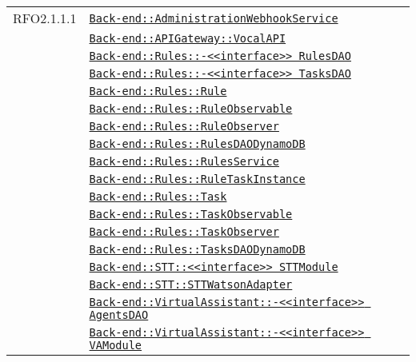 \begin{longtable}{|>{\centering}m{3cm}|m{10cm}<{\centering}|}
RFO2.1.1.1 & \hyperref[Back-end::AdministrationWebhookService]{\texttt{Back-end::AdministrationWebhookService}}\\
& \hyperref[Back-end::APIGateway::VocalAPI]{\texttt{Back-end::APIGateway::VocalAPI}}\\
& \hyperref[Back-end::Rules::<<interface>> RulesDAO]{\texttt{Back-end::Rules::-\linebreak <<interface>> RulesDAO}}\\
& \hyperref[Back-end::Rules::<<interface>> TasksDAO]{\texttt{Back-end::Rules::-\linebreak <<interface>> TasksDAO}}\\
& \hyperref[Back-end::Rules::Rule]{\texttt{Back-end::Rules::Rule}}\\
& \hyperref[Back-end::Rules::RuleObservable]{\texttt{Back-end::Rules::RuleObservable}}\\
& \hyperref[Back-end::Rules::RuleObserver]{\texttt{Back-end::Rules::RuleObserver}}\\
& \hyperref[Back-end::Rules::RulesDAODynamoDB]{\texttt{Back-end::Rules::RulesDAODynamoDB}}\\
& \hyperref[Back-end::Rules::RulesService]{\texttt{Back-end::Rules::RulesService}}\\
& \hyperref[Back-end::Rules::RuleTaskInstance]{\texttt{Back-end::Rules::RuleTaskInstance}}\\
& \hyperref[Back-end::Rules::Task]{\texttt{Back-end::Rules::Task}}\\
& \hyperref[Back-end::Rules::TaskObservable]{\texttt{Back-end::Rules::TaskObservable}}\\
& \hyperref[Back-end::Rules::TaskObserver]{\texttt{Back-end::Rules::TaskObserver}}\\
& \hyperref[Back-end::Rules::TasksDAODynamoDB]{\texttt{Back-end::Rules::TasksDAODynamoDB}}\\
& \hyperref[Back-end::STT::<<interface>> STTModule]{\texttt{Back-end::STT::<<interface>> STTModule}}\\
& \hyperref[Back-end::STT::STTWatsonAdapter]{\texttt{Back-end::STT::STTWatsonAdapter}}\\
& \hyperref[Back-end::VirtualAssistant::<<interface>> AgentsDAO]{\texttt{Back-end::VirtualAssistant::-\linebreak <<interface>> AgentsDAO}}\\
& \hyperref[Back-end::VirtualAssistant::<<interface>> VAModule]{\texttt{Back-end::VirtualAssistant::-\linebreak <<interface>> VAModule}}\\

\end{longtable}
